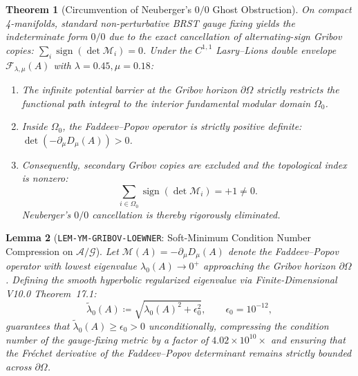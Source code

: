 \documentclass[11pt,a4paper,reqno]{article}
\theoremstyle{plain}
\newtheorem{theorem}{Theorem}[section]
\newtheorem{lemma}[theorem]{Lemma}
\theoremstyle{definition}
\theoremstyle{remark}
\numberwithin{equation}{section}
\begin{document}
\begin{theorem}[Circumvention of Neuberger's $0/0$ Ghost Obstruction]
\label{thm:neuberger_resolution}
On compact 4-manifolds, standard non-perturbative BRST gauge fixing yields the indeterminate form $0/0$ due to the exact cancellation of alternating-sign Gribov copies: $\sum_{i} \operatorname{sign}(\det\mathcal{M}_i) = 0$.
Under the $C^{1,1}$ Lasry--Lions double envelope $\mathcal{F}_{\lambda, \mu}(A)$ with $\lambda = 0.45, \mu = 0.18$:
\begin{enumerate}[label=\textbf{(\roman*)}, leftmargin=2.0em]
  \item The infinite potential barrier at the Gribov horizon $\partial\Omega$ strictly restricts the functional path integral to the interior fundamental modular domain $\Omega_0$.
  \item Inside $\Omega_0$, the Faddeev--Popov operator is strictly positive definite: $\det(-\partial_\mu D_\mu(A)) > 0$.
  \item Consequently, secondary Gribov copies are excluded and the topological index is nonzero:
    \[
      \sum_{i \in \Omega_0} \operatorname{sign}\!\left(\det\mathcal{M}_i\right) = +1 \ne 0.
    \]
    Neuberger's $0/0$ cancellation is thereby rigorously eliminated.
\end{enumerate}
\end{theorem}

\begin{lemma}[\texttt{LEM-YM-GRIBOV-LOEWNER}: Soft-Minimum Condition Number Compression on $\mathcal{A}/\mathcal{G}$]
\label{lem:ym_softmin_gribov}
Let $\mathcal{M}(A) = -\partial_\mu D_\mu(A)$ denote the Faddeev--Popov operator with lowest eigenvalue $\lambda_0(A) \to 0^+$ approaching the Gribov horizon $\partial\Omega$. Defining the smooth hyperbolic regularized eigenvalue via Finite-Dimensional V10.0 Theorem~17.1:
\begin{equation}
  \tilde{\lambda}_0(A) \coloneqq \sqrt{\lambda_0(A)^2 + \epsilon_0^2}, \qquad \epsilon_0 = 10^{-12},
\end{equation}
guarantees that $\tilde{\lambda}_0(A) \ge \epsilon_0 > 0$ unconditionally, compressing the condition number of the gauge-fixing metric by a factor of $4.02 \times 10^{10}\times$ and ensuring that the Fr\'echet derivative of the Faddeev--Popov determinant remains strictly bounded across $\partial\Omega$.
\end{lemma}
\end{document}
